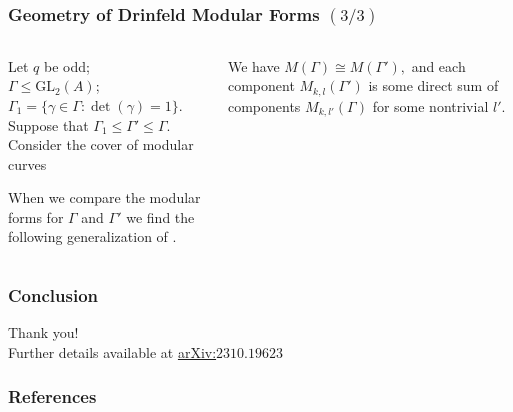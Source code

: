 \documentclass{beamer}
\numberwithin{equation}{section}
\numberwithin{case}{theorem}
\newcommand{\sX}{\mathscr{X}}		%
\newcommand{\GL}{\mathrm{GL}} 	%
\newcommand{\<}{\left\langle}
\renewcommand{\>}{\right\rangle}
\begin{document}
\begin{frame}
	\frametitle{Geometry of Drinfeld Modular Forms $(3/3)$}
	\begin{columns} 
		\begin{column}{.5\textwidth}
			Let $q$ be odd;\\
			$\Gamma\leq \GL_2(A)$;\\ 
			$\Gamma_1=\{\gamma\in \Gamma:\det(\gamma)=1\}.$\\
			Suppose that $\Gamma_1\leq \Gamma'\leq \Gamma.$ \pause \\
			Consider the cover of modular curves
			\begin{figure}[!h]\centering
			\end{figure}\pause
			When we compare the modular forms for $\Gamma$ and $\Gamma'$ we find the following generalization of \cite[Theorem $6.2$]{Franklin-geometry-Drinfeld-modular-forms}.
		\end{column}\pause
		\begin{column}{.5\textwidth}
			\begin{theorem}
				We have $M(\Gamma)\cong M(\Gamma'),$ \pause
				and each component $M_{k,l}(\Gamma')$ is some direct sum of components $M_{k,l'}(\Gamma)$ for some nontrivial $l'.$
			\end{theorem}
		\end{column}
	\end{columns}	
\end{frame}

\begin{frame}
	\frametitle{Conclusion}
	\centering
	Thank you!\\
	
	Further details available at \href{https://arxiv.org/abs/2310.19623}{arXiv:$2310.19623$} 
\end{frame}

\begin{frame}[allowframebreaks]
	\frametitle{References}
	
	
\end{frame}

	
\end{document}
